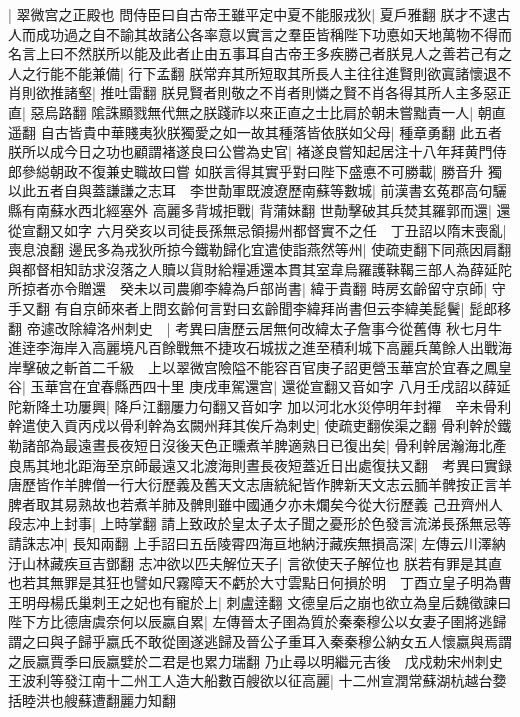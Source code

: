 |{
	翠微宫之正殿也}
問侍臣曰自古帝王雖平定中夏不能服戎狄|{
	夏戶雅翻}
朕才不逮古人而成功過之自不諭其故諸公各率意以實言之羣臣皆稱陛下功悳如天地萬物不得而名言上曰不然朕所以能及此者止由五事耳自古帝王多疾勝己者朕見人之善若己有之人之行能不能兼備|{
	行下孟翻}
朕常弃其所短取其所長人主往往進賢則欲寘諸懷退不肖則欲推諸壑|{
	推吐雷翻}
朕見賢者則敬之不肖者則憐之賢不肖各得其所人主多惡正直|{
	惡烏路翻}
隂誅顯戮無代無之朕踐祚以來正直之士比肩於朝未嘗黜責一人|{
	朝直遥翻}
自古皆貴中華賤夷狄朕獨愛之如一故其種落皆依朕如父母|{
	種章勇翻}
此五者朕所以成今日之功也顧謂褚遂良曰公嘗為史官|{
	褚遂良嘗知起居注十八年拜黄門侍郎參縂朝政不復兼史職故曰嘗}
如朕言得其實乎對曰陛下盛悳不可勝載|{
	勝音升}
獨以此五者自與蓋謙謙之志耳　李世勣軍既渡遼歷南蘇等數城|{
	前漢書玄菟郡高句驪縣有南蘇水西北經塞外}
高麗多背城拒戰|{
	背蒲妹翻}
世勣擊破其兵焚其羅郭而還|{
	還從宣翻又如字}
六月癸亥以司徒長孫無忌領揚州都督實不之任　丁丑詔以隋末喪亂|{
	喪息浪翻}
邊民多為戎狄所掠今鐵勒歸化宜遣使詣燕然等州|{
	使疏吏翻下同燕因肩翻}
與都督相知訪求沒落之人贖以貨財給糧逓還本貫其室韋烏羅護靺鞨三部人為薛延陀所掠者亦令贈還　癸未以司農卿李緯為戶部尚書|{
	緯于貴翻}
時房玄齡留守京師|{
	守手又翻}
有自京師來者上問玄齡何言對曰玄齡聞李緯拜尚書但云李緯美髭鬢|{
	髭郎移翻}
帝遽改除緯洛州刺史　|{
	考異曰唐歷云居無何改緯太子詹事今從舊傳}
秋七月牛進逹李海岸入高麗境凡百餘戰無不捷攻石城拔之進至積利城下高麗兵萬餘人出戰海岸擊破之斬首二千級　上以翠微宫險隘不能容百官庚子詔更營玉華宫於宜春之鳳皇谷|{
	玉華宫在宜春縣西四十里}
庚戌車駕還宫|{
	還從宣翻又音如字}
八月壬戌詔以薛延陀新降土功屢興|{
	降戶江翻屢力句翻又音如字}
加以河北水災停明年封襌　辛未骨利幹遣使入貢丙戍以骨利幹為玄闕州拜其俟斤為刺史|{
	使疏吏翻俟渠之翻}
骨利幹於鐵勒諸部為最遠晝長夜短日沒後天色正曛煮羊脾適熟日已復出矣|{
	骨利幹居瀚海北產良馬其地北距海至京師最遠又北渡海則晝長夜短蓋近日出處復扶又翻　考異曰實録唐歷皆作羊脾僧一行大衍歷義及舊天文志唐統紀皆作脾新天文志云胹羊髀按正言羊脾者取其易熟故也若煮羊肺及髀則雖中國通夕亦未爛矣今從大衍歷義}
己丑齊州人段志冲上封事|{
	上時掌翻}
請上致政於皇太子太子聞之憂形於色發言流涕長孫無忌等請誅志冲|{
	長知兩翻}
上手詔曰五岳陵霄四海亘地納汙藏疾無損高深|{
	左傳云川澤納汙山林藏疾亘吉鄧翻}
志冲欲以匹夫解位天子|{
	言欲使天子解位也}
朕若有罪是其直也若其無罪是其狂也譬如尺霧障天不虧於大寸雲點日何損於明　丁酉立皇子明為曹王明母楊氏巢刺王之妃也有寵於上|{
	刺盧逹翻}
文德皇后之崩也欲立為皇后魏徵諫曰陛下方比德唐虞奈何以辰嬴自累|{
	左傳晉太子圉為質於秦秦穆公以女妻子圉將逃歸謂之曰與子歸乎嬴氏不敢從圉遂逃歸及晉公子重耳入秦秦穆公納女五人懷嬴與焉謂之辰嬴賈季曰辰嬴嬖於二君是也累力瑞翻}
乃止尋以明繼元吉後　戊戍勅宋州刺史王波利等發江南十二州工人造大船數百艘欲以征高麗|{
	十二州宣潤常蘇湖杭越台㜈括睦洪也艘蘇遭翻麗力知翻}
